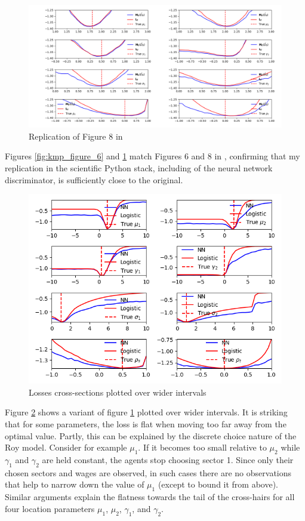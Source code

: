 \begin{figure}
    \includegraphics[width=\textwidth]{./Images/kmp_figure_8_sp.png}
    \caption{Replication of Figure 8 in \cite{kaji2023adversarial}}
    \label{fig:kmp_figure_8_sp}
\end{figure}

Figures \ref{fig:kmp_figure_6} and \ref{fig:kmp_figure_8_sp} match Figures 6 and 8 in \cite{kaji2023adversarial}, confirming that my replication in the scientific Python stack, including of the neural network discriminator, is sufficiently close to the original.  

\begin{figure}
    \includegraphics[width=\textwidth]{./Images/wide_loss_plots.png} %
    \caption{Losses cross-sections plotted over wider intervals}
    \label{fig:wide_loss_plots}
\end{figure}

Figure \ref{fig:wide_loss_plots} shows a variant of figure \ref{fig:kmp_figure_8_sp} plotted over wider intervals.
It is striking that for some parameters, the loss is flat when moving too far away from the optimal value.
Partly, this can be explained by the discrete choice nature of the Roy model.
Consider for example $\mu_1$.
If it becomes too small relative to $\mu_2$ while $\gamma_1$ and $\gamma_2$ are held constant, the agents stop choosing sector 1.
Since only their chosen sectors and wages are observed, in such cases there are no observations that help to narrow down the value of $\mu_1$ (except to bound it from above).
Similar arguments explain the flatness towards the tail of the cross-hairs for all four location parameters $\mu_1$, $\mu_2$, $\gamma_1$, and $\gamma_2$. %

